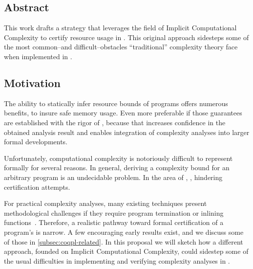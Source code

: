 \subsection*{Abstract}

This work drafts a strategy that leverages the field of Implicit Computational
Complexity to certify resource usage in . This original
approach sidesteps some of the most common--and difficult--obstacles
\enquote{traditional} complexity theory face when implemented in .

\subsection{Motivation}
\label{subsec:coqpl-motivation}

The ability to statically infer resource bounds of programs offers numerous
benefits, \eg to insure safe memory usage. Even more
preferable if those guarantees are established with the rigor of , because that increases confidence in the obtained analysis result
and enables integration of complexity analyses into
larger formal developments.

Unfortunately, computational complexity is notoriously difficult to represent
formally for several reasons. In general, deriving a complexity bound for an
arbitrary program is an undecidable problem. In the area
of , , hindering
certification attempts.

For practical complexity analyses, many existing
techniques present methodological challenges if they require \eg program
termination or inlining functions~\cite{carbonneaux2015}. Therefore, a realistic
pathway toward formal certification of a program's  is
narrow. A few encouraging early results exist, and we discuss some of those in
\autoref{subsec:coqpl-related}. In this proposal we will sketch how a different
approach, founded on Implicit Computational Complexity, could sidestep some of
the usual difficulties in implementing and verifying complexity analyses in
.

